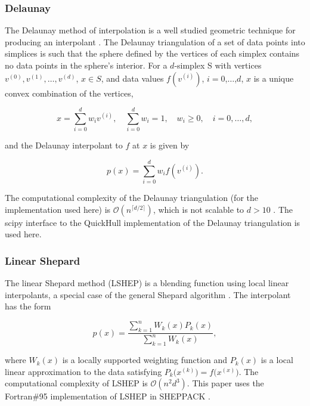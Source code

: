 \documentclass{scspaperproc}
\theoremstyle{scsthe}
\begin{document}
\vspace{-10pt}
\subsubsection{Delaunay}
\vspace{-10pt}
The Delaunay method of interpolation is a well studied geometric
technique for producing an interpolant . The
Delaunay triangulation of a set of data points into simplices is such
that the sphere defined by the vertices of each simplex contains no
data points in the sphere's interior. For a $d$-simplex S with
vertices $v^{(0)}, v^{(1)}, \ldots, v^{(d)}$, $x \in S$, and data
values $f(v^{(i)})$, $i=0$,$\ldots$,$d$, $x$ is a unique convex
combination of the vertices,

$$ x = \sum_{i=0}^{d} w_i v^{(i)}, \quad \sum_{i=0}^{d} w_i = 1, \quad
w_i \geq 0, \quad i=0,\ldots,d ,$$

and the Delaunay interpolant to $f$ at $x$ is given by

$$ p(x) = \sum_{i=0}^{d} w_i f(v^{(i)}). $$

The computational complexity of the Delaunay triangulation (for the
implementation used here) is $\mathcal{O}(n^{\lceil d/2 \rceil})$,
which is not scalable to $d > 10$ .
The scipy interface  to the QuickHull implementation
 of the Delaunay triangulation is used here.

\subsubsection{Linear Shepard}
\vspace{-10pt}
The linear Shepard method (LSHEP) is a blending function using local
linear interpolants, a special case of the general Shepard algorithm
. The interpolant has the form

$$ p(x) = \frac{\sum_{k=1}^{n}W_k(x)P_k(x)}{\sum_{k=1}^{n}W_k(x)} ,$$

where $W_k(x)$ is a locally supported weighting function and $P_k(x)$
is a local linear approximation to the data satisfying
$P_k\big(x^{(k)}\big) = f\big(x^{(x)}\big)$. The computational
complexity of LSHEP is $\mathcal{O}(n^2d^3)$. This paper uses the
Fortran\#95 implementation of LSHEP in SHEPPACK
.

\end{document}

